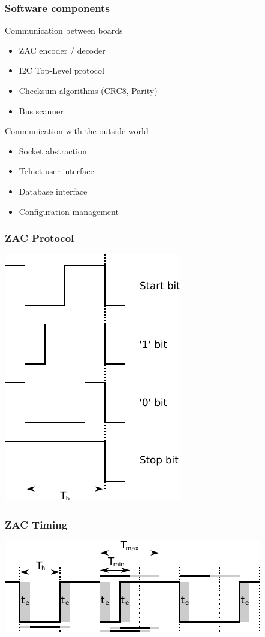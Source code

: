 \documentclass[t]{beamer}
\begin{document}
\begin{frame}[c]
    \frametitle{Software components}
    \begin{block}{Communication between boards}
		\begin{itemize}
			\item ZAC encoder / decoder
			\item I2C Top-Level protocol\\
			\item Checksum algorithms (CRC8, Parity)
			\item Bus scanner
		\end{itemize}
  \end{block}
  \begin{block}{Communication with the outside world}
		\begin{itemize}
			\item Socket abstraction
			\item Telnet user interface
			\item Database interface
			\item Configuration management
		\end{itemize}
  \end{block}
\end{frame}
\begin{frame}[c]
    \frametitle{ZAC Protocol}
  \begin{center}
  	\includegraphics[width=0.4\linewidth]{img/zac_bits.pdf}\\
  \vspace{0.5cm}
  \end{center}
\end{frame}
\begin{frame}[c]
    \frametitle{ZAC Timing}
  \begin{center}
  	\includegraphics[width=0.8\linewidth]{img/zac_timing.pdf}\\
  \vspace{0.5cm}
  \end{center}
\end{frame}
\end{document}
